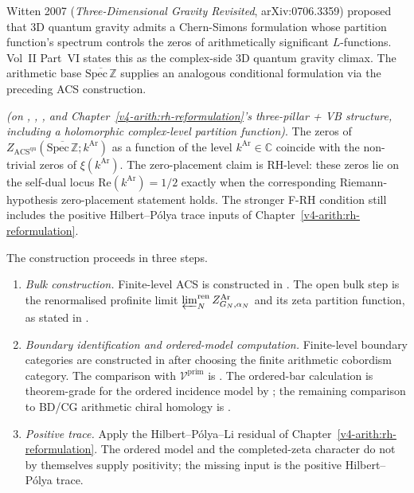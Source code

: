 Witten 2007 (\emph{Three-Dimensional Gravity Revisited},
arXiv:0706.3359) proposed that 3D quantum gravity admits a
Chern-Simons formulation whose partition function's spectrum controls
the zeros of arithmetically significant \(L\)-functions. Vol~II Part~VI
states this as the complex-side 3D quantum gravity climax. The
arithmetic base \(\overline{\mathrm{Spec}\,\mathbb{Z}}\) supplies an
analogous conditional formulation via the preceding ACS construction.

\begin{theorem}
\label{v4-arith:3d-acs:thm:arith-gravity-FRH}
\ClaimStatusConditional \emph{(on ,
,
, and
Chapter~\ref{v4-arith:rh-reformulation}'s three-pillar + VB structure,
including a holomorphic complex-level partition function)}.
The zeros of
\(Z_{\mathrm{ACS}^{\mathrm{qu}}}(\overline{\mathrm{Spec}\,\mathbb{Z}};k^{\mathrm{Ar}})\)
as a function of the level \(k^{\mathrm{Ar}}\in\mathbb{C}\) coincide with
the non-trivial zeros of \(\xi(k^{\mathrm{Ar}})\). The zero-placement
claim is RH-level: these zeros lie on the self-dual locus
\(\mathrm{Re}(k^{\mathrm{Ar}})=1/2\) exactly when the corresponding
Riemann-hypothesis zero-placement statement holds. The stronger F-RH
condition still includes the positive Hilbert--P\'olya trace inputs of
Chapter~\ref{v4-arith:rh-reformulation}.
\end{theorem}

\begin{remark}
\label{v4-arith:3d-acs:rem:three-step}
The construction proceeds in three steps.
\begin{enumerate}
\item \emph{Bulk construction.} Finite-level ACS is constructed in
. The open bulk step is
the renormalised profinite limit
\(\varprojlim_{N}^{\mathrm{ren}}Z^{\mathrm{Ar}}_{G_{N},\alpha_{N}}\)
and its zeta partition function, as stated in
.
\item \emph{Boundary identification and ordered-model computation.}
Finite-level boundary categories are constructed in
 after choosing the
finite arithmetic cobordism category. The comparison with
\(\mathcal V^{\mathrm{prim}}\) is
. The ordered-bar
calculation is theorem-grade for the ordered incidence model by
; the remaining comparison to
BD/CG arithmetic chiral homology is
.
\item \emph{Positive trace.} Apply the Hilbert--P\'olya--Li residual of
Chapter~\ref{v4-arith:rh-reformulation}. The ordered model and the
completed-zeta character do not by themselves supply positivity; the
missing input is the positive Hilbert--P\'olya trace.
\end{enumerate}
\end{remark}

